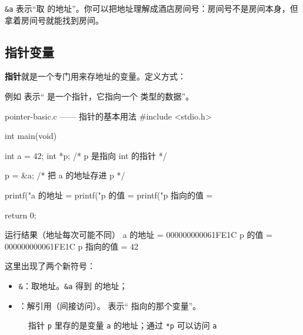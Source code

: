 \texttt{\&a} 表示“取  的地址”。你可以把地址理解成酒店房间号：房间号不是房间本身，但拿着房间号就能找到房间。

\subsection{指针变量}

\textbf{指针}就是一个专门用来存地址的变量。定义方式：

\begin{center}
\end{center}

例如  表示“ 是一个指针，它指向一个  类型的数据”。

\begin{codebox}{pointer-basic.c —— 指针的基本用法}
#include <stdio.h>

int main(void)
{
    int a = 42;
    int *p;         /* p 是指向 int 的指针 */

    p = &a;         /* 把 a 的地址存进 p */

    printf("a 的地址 = %
    printf("p 的值   = %
    printf("p 指向的值 = %

    return 0;
}
\end{codebox}

\begin{outbox}{运行结果（地址每次可能不同）}
a 的地址 = 000000000061FE1C
p 的值   = 000000000061FE1C
p 指向的值 = 42
\end{outbox}

这里出现了两个新符号：

\begin{itemize}
  \item \texttt{\&}：取地址。\texttt{\&a} 得到  的地址；
  \item \code{*}：解引用（间接访问）。 表示“ 指向的那个变量”。
\end{itemize}

\begin{figure}[htbp]
  \centering
  \caption{指针 \texttt{p} 里存的是变量 \texttt{a} 的地址；通过 \texttt{*p} 可以访问 \texttt{a}}
  \label{fig:pointer-basic}
\end{figure}

